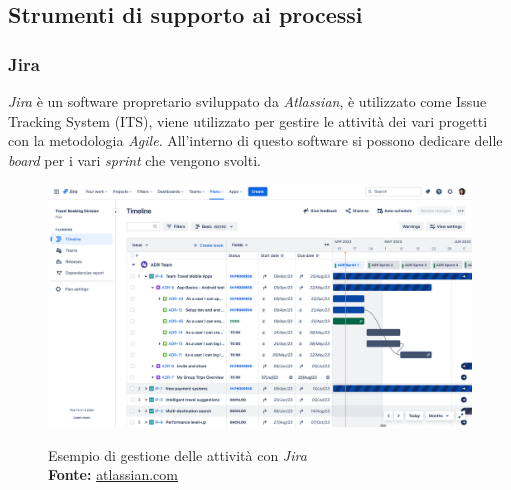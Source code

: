 \subsection{Strumenti di supporto ai processi}\noindent
\subsubsection*{Jira}\noindent
\textit{Jira} è un software propretario sviluppato da \textit{Atlassian}, è utilizzato come Issue Tracking System (ITS), viene utilizzato per gestire le attività dei vari progetti con la metodologia \textit{Agile}.
All'interno di questo software si possono dedicare delle \textit{board} per i vari \textit{sprint} che vengono svolti.
\begin{figure}[H]
    \centering
    \includegraphics[alt={Esempio di gestione delle attività con \textit{Jira}}, width=0.7\columnwidth]{img/jira.png}
    \caption[Esempio di gestione delle attività con \textit{Jira}]{Esempio di gestione delle attività con \textit{Jira}\\ \textbf{Fonte:} \href{https://www.atlassian.com/it/software/jira/premium}{atlassian.com}}
    \label{fig:jira}
\end{figure}
